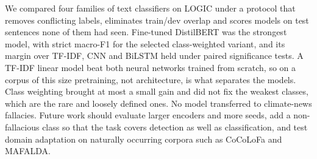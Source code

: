 We compared four families of text classifiers on LOGIC under a protocol that removes conflicting labels, eliminates train/dev overlap and scores models on \nStrict{} test sentences none of them had seen. Fine-tuned DistilBERT was the strongest model, with strict macro-F1 \fBertCw{} for the selected class-weighted variant, and its margin over TF-IDF, CNN and BiLSTM held under paired significance tests. A TF-IDF linear model beat both neural networks trained from scratch, so on a corpus of this size pretraining, not architecture, is what separates the models. Class weighting brought at most a small gain and did not fix the weakest classes, which are the rare and loosely defined ones. No model transferred to climate-news fallacies. Future work should evaluate larger encoders and more seeds, add a non-fallacious class so that the task covers detection as well as classification, and test domain adaptation on naturally occurring corpora such as CoCoLoFa and MAFALDA.
